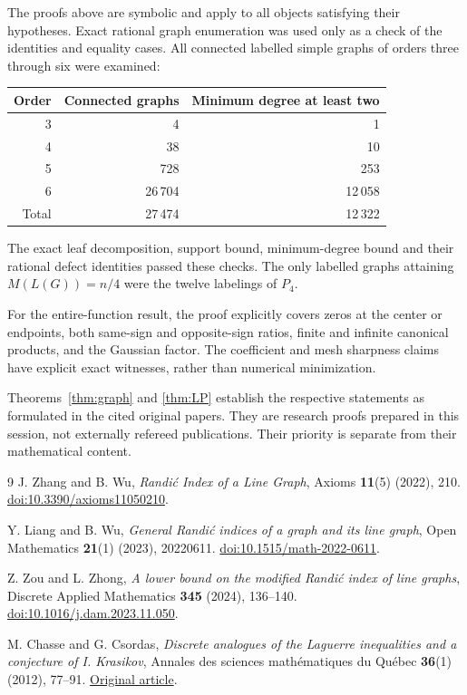 \documentclass[11pt]{article}
\theoremstyle{remark}\newtheorem{remark}[theorem]{Remark}
\begin{document}
The proofs above are symbolic and apply to all objects satisfying their
hypotheses. Exact rational graph enumeration was used only as a check of
the identities and equality cases. All connected labelled simple graphs
of orders three through six were examined:
\begin{center}
\begin{tabular}{@{}rrr@{}}\toprule
Order & Connected graphs & Minimum degree at least two\\\midrule
3 & 4 & 1\\
4 & 38 & 10\\
5 & 728 & 253\\
6 & 26\,704 & 12\,058\\\midrule
Total & 27\,474 & 12\,322\\\bottomrule
\end{tabular}
\end{center}
The exact leaf decomposition, support bound, minimum-degree bound and
their rational defect identities passed these checks. The only labelled
graphs attaining $M(L(G))=n/4$ were the twelve labelings of $P_4$.

For the entire-function result, the proof explicitly covers zeros at
the center or endpoints, both same-sign and opposite-sign ratios, finite
and infinite canonical products, and the Gaussian factor. The coefficient
and mesh sharpness claims have explicit exact witnesses, rather than
numerical minimization.

Theorems~\ref{thm:graph} and \ref{thm:LP} establish the respective statements
as formulated in the cited original papers. They are research proofs
prepared in this session, not externally refereed publications. Their
priority is separate from their mathematical content.

\begin{thebibliography}{9}
J. Zhang and B. Wu,
\emph{Randi\'c Index of a Line Graph},
Axioms \textbf{11}(5) (2022), 210.
\href{https://doi.org/10.3390/axioms11050210}{doi:10.3390/axioms11050210}.

Y. Liang and B. Wu,
\emph{General Randi\'c indices of a graph and its line graph},
Open Mathematics \textbf{21}(1) (2023), 20220611.
\href{https://doi.org/10.1515/math-2022-0611}{doi:10.1515/math-2022-0611}.

Z. Zou and L. Zhong,
\emph{A lower bound on the modified Randi\'c index of line graphs},
Discrete Applied Mathematics \textbf{345} (2024), 136--140.
\href{https://doi.org/10.1016/j.dam.2023.11.050}{doi:10.1016/j.dam.2023.11.050}.

M. Chasse and G. Csordas,
\emph{Discrete analogues of the Laguerre inequalities and a conjecture of
I. Krasikov},
Annales des sciences math\'ematiques du Qu\'ebec \textbf{36}(1) (2012), 77--91.
\href{https://www.labmath.uqam.ca/~annales/volumes/36-1/PDF/077-091.pdf}{Original article}.
\end{thebibliography}
\end{document}
